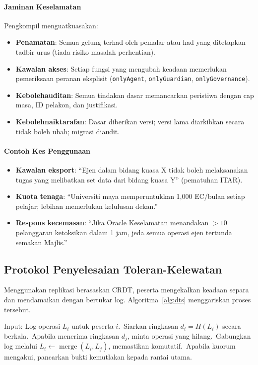 \documentclass[11pt]{article}
\begin{document}
\paragraph{Jaminan Keselamatan} Pengkompil menguatkuasakan:
\begin{itemize}[noitemsep]
  \item \textbf{Penamatan}: Semua gelung terhad oleh pemalar atau had yang ditetapkan tadbir urus (tiada risiko masalah perhentian).
  \item \textbf{Kawalan akses}: Setiap fungsi yang mengubah keadaan memerlukan pemeriksaan peranan eksplisit (\texttt{onlyAgent}, \texttt{onlyGuardian}, \texttt{onlyGovernance}).
  \item \textbf{Kebolehauditan}: Semua tindakan dasar memancarkan peristiwa dengan cap masa, ID pelakon, dan justifikasi.
  \item \textbf{Kebolehnaiktarafan}: Dasar diberikan versi; versi lama diarkibkan secara tidak boleh ubah; migrasi diaudit.
\end{itemize}

\paragraph{Contoh Kes Penggunaan}
\begin{itemize}[noitemsep]
  \item \textbf{Kawalan eksport}: ``Ejen dalam bidang kuasa X tidak boleh melaksanakan tugas yang melibatkan set data dari bidang kuasa Y'' (pematuhan ITAR).
  \item \textbf{Kuota tenaga}: ``Universiti maya memperuntukkan 1,000 EC/bulan setiap pelajar; lebihan memerlukan kelulusan dekan.''
  \item \textbf{Respons kecemasan}: ``Jika Oracle Keselamatan menandakan $>10$ pelanggaran ketoksikan dalam 1 jam, jeda semua operasi ejen tertunda semakan Majlis.''
\end{itemize}

\subsection{Protokol Penyelesaian Toleran-Kelewatan}
Menggunakan replikasi berasaskan CRDT, peserta mengekalkan keadaan separa dan mendamaikan dengan bertukar log. Algoritma~\ref{alg:dts} menggariskan proses tersebut.

\begin{algorithm}[H]
  \caption{Penyelesaian Toleran-Kelewatan (DTS)}
  \label{alg:dts}
  \begin{algorithmic}[1]
    \STATE Input: Log operasi $L_i$ untuk peserta $i$.\
    \STATE Siarkan ringkasan $d_i = H(L_i)$ secara berkala.\
    \STATE Apabila menerima ringkasan $d_j$, minta operasi yang hilang.\
    \STATE Gabungkan log melalui $L_i \leftarrow \operatorname{merge}(L_i, L_j)$, memastikan komutatif.\
    \STATE Apabila kuorum mengakui, pancarkan bukti kemutlakan kepada rantai utama.\
  \end{algorithmic}
\end{algorithm}
\end{document}
